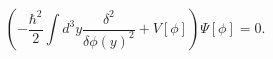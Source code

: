 \begin{equation}\label{Sch}\left(-\frac{\hbar^2}{2}\int\!
d^3y\frac{\delta^2}{\delta\phi(y)^2}+V[\phi]\right)\Psi[\phi]=0.\end{equation}

